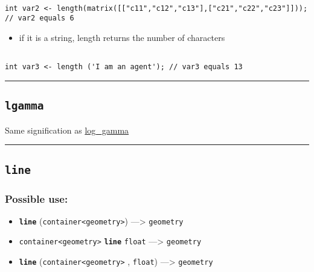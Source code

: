 \documentclass[]{book}
\providecommand{\tightlist}{%
  \setlength{\itemsep}{0pt}\setlength{\parskip}{0pt}}
\theoremstyle{definition}
\theoremstyle{definition}
\theoremstyle{definition}
\theoremstyle{remark}
\begin{document}
\begin{verbatim}
 
int var2 <- length(matrix([["c11","c12","c13"],["c21","c22","c23"]])); // var2 equals 6
\end{verbatim}

\begin{itemize}
\tightlist
\item
  if it is a string, length returns the number of characters
\end{itemize}

\begin{verbatim}
 
int var3 <- length ('I am an agent'); // var3 equals 13
\end{verbatim}

\begin{center}\rule{0.5\linewidth}{\linethickness}\end{center}

\subsection{\texorpdfstring{\texttt{lgamma}}{lgamma}}\label{lgamma}

Same signification as \href{OperatorsIM\#log_gamma}{log\_gamma}

\begin{center}\rule{0.5\linewidth}{\linethickness}\end{center}

\subsection{\texorpdfstring{\texttt{line}}{line}}\label{line}

\subsubsection{Possible use:}\label{possible-use-321}

\begin{itemize}
\tightlist
\item
  \textbf{\texttt{line}}
  (\texttt{container\textless{}geometry\textgreater{}})
  ---\textgreater{} \texttt{geometry}
\item
  \texttt{container\textless{}geometry\textgreater{}}
  \textbf{\texttt{line}} \texttt{float} ---\textgreater{}
  \texttt{geometry}
\item
  \textbf{\texttt{line}}
  (\texttt{container\textless{}geometry\textgreater{}} , \texttt{float})
  ---\textgreater{} \texttt{geometry}
\end{itemize}
\end{document}
